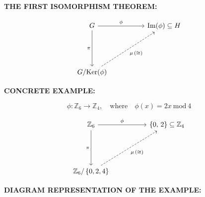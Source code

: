 \documentclass[tikz, border=5mm]{article}
\begin{document}
\pagestyle{empty}

\textbf{THE FIRST ISOMORPHISM THEOREM:}

\[
\begin{tikzcd}[column sep=5em,row sep=5em]
    G \arrow{r}{\phi} \arrow{d}[left]{\pi} & \text{Im}(\phi) \subseteq H \\
    G/\text{Ker}(\phi) \arrow[dashrightarrow]{ru}[below right]{\mu\,(\cong)} 
\end{tikzcd}
\]
 
\textbf{CONCRETE EXAMPLE:}
  
\[
\phi: \mathbb{Z}_{6} \to \mathbb{Z}_{4}, \quad \textrm{where} \quad
\phi(x) = 2x \: \textrm{mod}\:4
\]  
 

\[ 
\begin{tikzcd}[column sep=5em,row sep=5em]
    \mathbb{Z}_{6} \arrow{r}{\phi} \arrow{d}[left]{\pi} & \{ 0,\,2 \} \subseteq \mathbb{Z}_4 \\
    \mathbb{Z}_{6}/\left\{ 0, 2, 4 \right\} \arrow[dashrightarrow]{ru}[below right]{\mu\,(\cong)} 
\end{tikzcd}
\]

\def\firstcircle{(2,3) circle (1.3cm)}
\def\secondcircle{(2,-1) circle (1.3cm)}
\def\thirdcircle{(7.05,3) circle (1.3cm)}
\def\myellipse {(6.75,3) ellipse (0.5cm and 1cm)}

\textbf{DIAGRAM REPRESENTATION OF THE EXAMPLE:}
\end{document}
